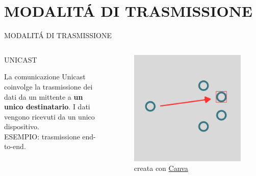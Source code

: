\documentclass[aspectratio=1610,handout]{beamer}
\begin{document}
\section{MODALIT\'A DI TRASMISSIONE}

\begin{frame}{MODALIT\'A DI TRASMISSIONE}
    \begin{columns}
        \begin{alertblock}{UNICAST}
            \begin{minipage}{0.96\linewidth}
                \justifying
                La comunicazione Unicast coinvolge la trasmissione dei dati da un mittente a \textbf{un 
                unico destinatario}. I dati vengono ricevuti da un unico dispositivo.\\
                ESEMPIO: trasmissione end-to-end.
            \end{minipage}
        \end{alertblock}
           \begin{figure}
               \includegraphics[width=\linewidth]{img/unicast.png}
               \caption{{creata con \href{https://www.canva.com}{Canva}}}
           \end{figure}
    \end{columns}
\end{frame}
\end{document}
